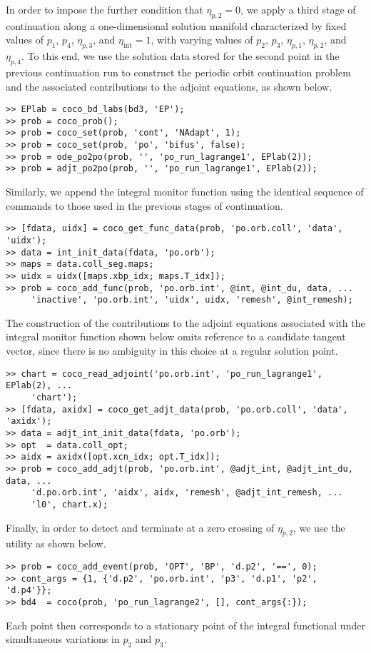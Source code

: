 In order to impose the further condition that $\eta_{p,2}=0$, we apply a third stage of continuation along a one-dimensional solution manifold characterized by fixed values of $p_1$, $p_4$, $\eta_{p,3}$, and $\eta_\mathrm{int}=1$, with varying values of $p_2$, $p_3$, $\eta_{p,1}$, $\eta_{p,2}$, and $\eta_{p,4}$. To this end, we use the solution data stored for the second  point in the previous continuation run to construct the periodic orbit continuation problem and the associated contributions to the adjoint equations, as shown below.
\begin{lstlisting}[language=coco-highlight]
>> EPlab = coco_bd_labs(bd3, 'EP');
>> prob = coco_prob();
>> prob = coco_set(prob, 'cont', 'NAdapt', 1);
>> prob = coco_set(prob, 'po', 'bifus', false);
>> prob = ode_po2po(prob, '', 'po_run_lagrange1', EPlab(2));
>> prob = adjt_po2po(prob, '', 'po_run_lagrange1', EPlab(2));
\end{lstlisting}
Similarly, we append the integral monitor function using the identical sequence of commands to those used in the previous stages of continuation.
\begin{lstlisting}[language=coco-highlight]
>> [fdata, uidx] = coco_get_func_data(prob, 'po.orb.coll', 'data', 'uidx');
>> data = int_init_data(fdata, 'po.orb');
>> maps = data.coll_seg.maps;
>> uidx = uidx([maps.xbp_idx; maps.T_idx]);
>> prob = coco_add_func(prob, 'po.orb.int', @int, @int_du, data, ...
     'inactive', 'po.orb.int', 'uidx', uidx, 'remesh', @int_remesh);
\end{lstlisting}

The construction of the  contributions to the adjoint equations associated with the integral monitor function shown below omits reference to a candidate tangent vector, since there is no ambiguity in this choice at a regular solution point.
\begin{lstlisting}[language=coco-highlight]
>> chart = coco_read_adjoint('po.orb.int', 'po_run_lagrange1', EPlab(2), ...
     'chart');
>> [fdata, axidx] = coco_get_adjt_data(prob, 'po.orb.coll', 'data', 'axidx');
>> data = adjt_int_init_data(fdata, 'po.orb');
>> opt  = data.coll_opt;
>> aidx = axidx([opt.xcn_idx; opt.T_idx]);
>> prob = coco_add_adjt(prob, 'po.orb.int', @adjt_int, @adjt_int_du, data, ...
     'd.po.orb.int', 'aidx', aidx, 'remesh', @adjt_int_remesh, ...
     'l0', chart.x);
\end{lstlisting}
Finally, in order to detect and terminate at a zero crossing of $\eta_{p,2}$, we use the  utility as shown below.
\begin{lstlisting}[language=coco-highlight]
>> prob = coco_add_event(prob, 'OPT', 'BP', 'd.p2', '==', 0);
>> cont_args = {1, {'d.p2', 'po.orb.int', 'p3', 'd.p1', 'p2', 'd.p4'}};
>> bd4  = coco(prob, 'po_run_lagrange2', [], cont_args{:});
\end{lstlisting}
Each  point then corresponds to a stationary point of the integral functional under simultaneous variations in $p_2$ and $p_3$.\\
\medskip

